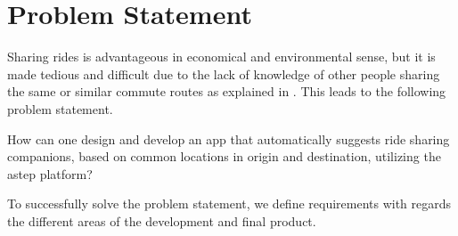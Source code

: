\section{Problem Statement}
Sharing rides is advantageous in economical and environmental sense, but it is made tedious and difficult due to the lack of knowledge of other people sharing the same or similar commute routes as explained in \cite{doi:10.1080/01441647.2011.621557}. This leads to the following problem statement.

{\addtolength{\leftskip}{10mm}\addtolength{\rightskip}{10mm}\noindent\hrulefill\it

\noindent How can one design and develop an app that automatically suggests ride sharing companions, based on common locations in origin and destination, utilizing the \gls{astep} platform? 

\noindent\hrulefill

}

To successfully solve the problem statement, we  define requirements with regards the different areas of the development and final product.
